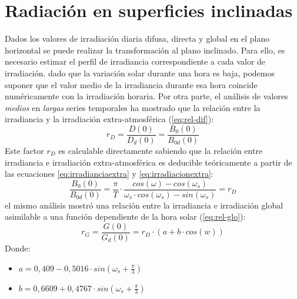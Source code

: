 \section{Radiación en superficies inclinadas}
\label{sec:org5540a6a}
\label{sec:radiacion-superficies-inclinadas}
Dados los valores de irradiación diaria difusa, directa y global en el plano horizontal se puede realizar la transformación al plano inclinado. Para ello, es necesario estimar el perfil de irradiancia correspondiente a cada valor de irradiación. dado que la variación solar durante una hora es baja, podemos suponer que el valor medio de la irradiancia durante esa hora coincide numéricamente con la irradiación horaria. Por otra parte, el análisis de valores \emph{medios}  en \emph{largas} series temporales ha mostrado que la relación entre la irradiancia y la irradiación extra-atmosférica \cite{Collares-Pereira.Rabl1979} (\ref{eq:rel-dif}):
\begin{equation}
r_D=\frac{D(0)}{D_d(0)}=\frac{B_0(0)}{B_{0d}(0)}
\label{eq:rel-dif}
\end{equation}
Este factor \(r_D\) es calculable directamente sabiendo que la relación entre irradiancia e irradiación extra-atmosférica es deducible teóricamente a partir de las ecuaciones \ref{eq:irradianciaextra} y \ref{eq:irradiacionextra}:
\begin{equation}
\frac{B_0(0)}{B_{0d}(0)}=\frac{\pi}{T}\cdot \frac{cos(\omega)-cos(\omega_s)}{\omega_s\cdot cos(\omega_s)-sin(\omega_s)}=r_D
\label{eq:rel-dif2}
\end{equation}
el mismo análisis mostró una relación entre la irradiancia e irradiación global asimilable a una función dependiente de la hora solar (\ref{eq:rel-glo}):
\begin{equation}
r_G=\frac{G(0)}{G_d(0)}=r_D\cdot(a+b\cdot cos(w))
\label{eq:rel-glo}
\end{equation}
Donde:
\begin{itemize}
\item \(a=0,409-0,5016\cdot sin(\omega_s+\frac{\pi}{3})\)
\item \(b=0,6609+0,4767\cdot sin(\omega_s+\frac{\pi}{3})\)
\end{itemize}

